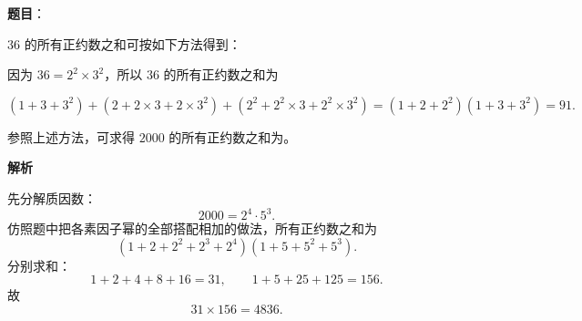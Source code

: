 \begin{answer}

\textbf{题目}：

$36$ 的所有正约数之和可按如下方法得到：

因为 $36=2^2\times3^2$，所以 $36$ 的所有正约数之和为

\nopagebreak[4]
\[(1+3+3^2)+(2+2\times3+2\times3^2)+(2^2+2^2\times3+2^2\times3^2)=(1+2+2^2)(1+3+3^2)=91.\]

参照上述方法，可求得 $2000$ 的所有正约数之和为\gkblank{}。

\textbf{解析}

先分解质因数：
\nopagebreak[4]
\[2000=2^4\cdot5^3.\]
仿照题中把各素因子幂的全部搭配相加的做法，所有正约数之和为
\nopagebreak[4]
\[(1+2+2^2+2^3+2^4)(1+5+5^2+5^3).\]
分别求和：
\nopagebreak[4]
\[1+2+4+8+16=31,\qquad 1+5+25+125=156.\]
故
\nopagebreak[4]
\[31\times156=4836.\]


\end{answer}
